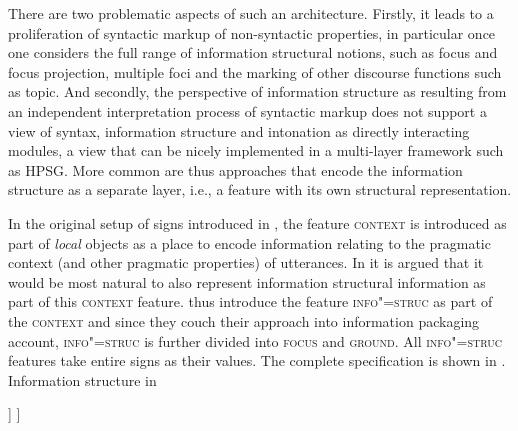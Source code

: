 \documentclass[output=paper]{langsci/langscibook}
\begin{document}
There are two problematic aspects of such an architecture. Firstly, it
leads to a proliferation of syntactic markup of non-syntactic
properties, in particular once one considers the full range of
information structural notions, such as focus and focus projection,
multiple foci and the marking of other discourse functions such as
topic. And secondly, the perspective of information structure as
resulting from an independent interpretation process of syntactic
markup does not support a view of syntax, information structure and
intonation as directly interacting modules, a view that can be nicely
implemented in a multi-layer framework such as HPSG.
More common are thus approaches that encode the information structure
as a separate layer, i.e., a feature with its own structural
representation.

In the original setup of signs introduced in \cite{ps2}, the feature
\textsc{context} is introduced as part of \textit{local} objects as a
place to encode information relating to the pragmatic context (and
other pragmatic properties) of utterances. In \cite{EV96a} it is
argued that it would be most natural to also represent information
structural information as part of this \textsc{context}
feature. \cite{EV96a} thus introduce the feature \textsc{info"=struc}
as part of the \textsc{context} and since they couch their
approach into  information packaging account,
\textsc{info"=struc} is further divided into \textsc{focus} and
\textsc{ground}. All \textsc{info"=struc} features take entire signs as
their values. The complete specification is shown in
.
\ea \label{fig:e-v-info-struc}
Information structure in \cite[56]{EV96a}
        \leavevmode
    \begin{avm}
    [\tp{sign}\\
     synsem|local|context|info-struc & [focus & sign\\
                                        ground & [link & sign\\
                                                  tail & sign]
                                       ]
    ]     
    \end{avm}
\z
\end{document}
